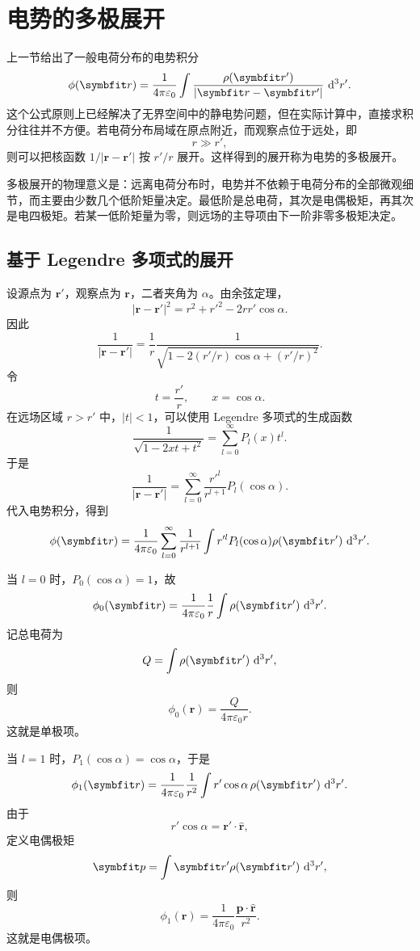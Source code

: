 \section{电势的多极展开}

上一节给出了一般电荷分布的电势积分
\[
\phi(\bm{r})
=
\frac{1}{4\pi\varepsilon_{0}}
\int
\frac{\rho(\bm{r}')}{|\bm{r}-\bm{r}'|}
\,\dif^{3}r'.
\]
这个公式原则上已经解决了无界空间中的静电势问题，但在实际计算中，直接求积分往往并不方便。若电荷分布局域在原点附近，而观察点位于远处，即
\[
r\gg r',
\]
则可以把核函数 $1/|\bm{r}-\bm{r}'|$ 按 $r'/r$ 展开。这样得到的展开称为电势的多极展开。

多极展开的物理意义是：远离电荷分布时，电势并不依赖于电荷分布的全部微观细节，而主要由少数几个低阶矩量决定。最低阶是总电荷，其次是电偶极矩，再其次是电四极矩。若某一低阶矩量为零，则远场的主导项由下一阶非零多极矩决定。

\subsection{基于 Legendre 多项式的展开}

设源点为 $\bm{r}'$，观察点为 $\bm{r}$，二者夹角为 $\alpha$。由余弦定理，
\[
|\bm{r}-\bm{r}'|^{2}
=
r^{2}+r'^{2}-2rr'\cos\alpha.
\]
因此
\[
\frac{1}{|\bm{r}-\bm{r}'|}
=
\frac{1}{r}
\frac{1}{
	\sqrt{
		1-2(r'/r)\cos\alpha+(r'/r)^{2}
	}
}.
\]
令
\[
t=\frac{r'}{r},
\qquad
x=\cos\alpha.
\]
在远场区域 $r>r'$ 中，$|t|<1$，可以使用 Legendre 多项式的生成函数
\[
\frac{1}{\sqrt{1-2xt+t^{2}}}
=
\sum_{l=0}^{\infty}P_{l}(x)t^{l}.
\]
于是
\begin{equation}
	\frac{1}{|\bm{r}-\bm{r}'|}
	=
	\sum_{l=0}^{\infty}
	\frac{r'^{l}}{r^{l+1}}
	P_{l}(\cos\alpha).
	\label{eq:10:legendre-kernel-expansion}
\end{equation}
代入电势积分，得到
\begin{equation}
	\phi(\bm{r})
	=
	\frac{1}{4\pi\varepsilon_{0}}
	\sum_{l=0}^{\infty}
	\frac{1}{r^{l+1}}
	\int
	r'^{l}P_{l}(\cos\alpha)
	\rho(\bm{r}')
	\,\dif^{3}r'.
	\label{eq:10:legendre-multipole}
\end{equation}

当 $l=0$ 时，$P_{0}(\cos\alpha)=1$，故
\[
\phi_{0}(\bm{r})
=
\frac{1}{4\pi\varepsilon_{0}}
\frac{1}{r}
\int \rho(\bm{r}')\,\dif^{3}r'.
\]
记总电荷为
\[
Q
=
\int \rho(\bm{r}')\,\dif^{3}r',
\]
则
\[
\phi_{0}(\bm{r})
=
\frac{Q}{4\pi\varepsilon_{0}r}.
\]
这就是单极项。

当 $l=1$ 时，$P_{1}(\cos\alpha)=\cos\alpha$，于是
\[
\phi_{1}(\bm{r})
=
\frac{1}{4\pi\varepsilon_{0}}
\frac{1}{r^{2}}
\int r'\cos\alpha\,\rho(\bm{r}')\,\dif^{3}r'.
\]
由于
\[
r'\cos\alpha
=
\bm{r}'\cdot\hat{\bm{r}},
\]
定义电偶极矩
\begin{equation}
	\bm{p}
	=
	\int
	\bm{r}'\rho(\bm{r}')
	\,\dif^{3}r',
	\label{eq:10:dipole-moment}
\end{equation}
则
\[
\phi_{1}(\bm{r})
=
\frac{1}{4\pi\varepsilon_{0}}
\frac{\bm{p}\cdot\hat{\bm{r}}}{r^{2}}.
\]
这就是电偶极项。

